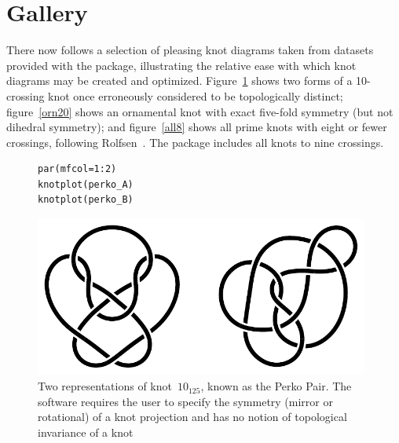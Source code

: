 \documentclass{birkjour}
\theoremstyle{definition}
\theoremstyle{remark}
\numberwithin{equation}{section}
\begin{document}
\clearpage
\section{Gallery}

There now follows a selection of pleasing knot diagrams taken from
datasets provided with the package, illustrating the relative ease
with which knot diagrams may be created and optimized.
Figure~\ref{perko_AB} shows two forms of a 10-crossing knot once
erroneously considered to be topologically distinct;
figure~\ref{orn20} shows an ornamental knot with exact five-fold
symmetry (but not dihedral symmetry); and figure~\ref{all8} shows all
prime knots with eight or fewer crossings, following
Rolfsen~\cite{rolfsen1976}.  The package includes all knots to nine
crossings.

\begin{figure}[htbp]
  \begin{center}
\begin{verbatim}
par(mfcol=1:2)
knotplot(perko_A)
knotplot(perko_B)
\end{verbatim}
\includegraphics[width=11cm]{knot-perko_A_and_B}
\caption{Two representations of knot~$10_{125}$, known as the 
  \label{perko_AB}  Perko Pair.  The software requires the user to
  specify the symmetry (mirror or rotational) of a knot projection and
  has no notion of topological invariance of a knot}
  \end{center}
\end{figure}
\end{document}
